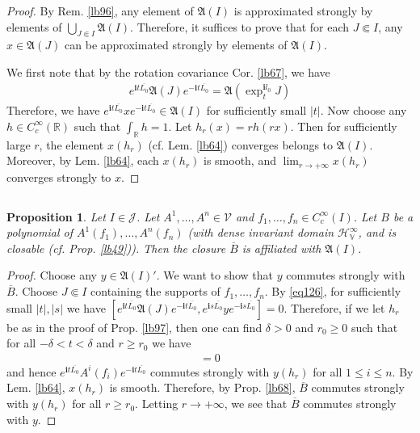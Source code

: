 \documentclass[12pt,b5paper,notitlepage]{article}
\theoremstyle{definition}
\theoremstyle{plain}
\newtheorem{pp}[df]{Proposition}
\newcommand{\fk}{\mathfrak}
\newcommand{\mc}{\mathcal}
\newcommand{\ovl}{\overline}
\newcommand{\im}{\mathbf{i}}
\newcommand{\Rbb}{\mathbb R}
\newcommand{\HV}{\mathcal H_{\mathbb V}}
\numberwithin{equation}{section}
\begin{document}
\begin{proof}
By Rem. \ref{lb96}, any element of $\fk A(I)$ is approximated strongly by elements of $\bigcup_{J\Subset I}\fk A(I)$. Therefore, it suffices to prove that for each $J\Subset I$, any $x\in\fk A(J)$ can be approximated strongly by elements of $\fk A(I)$. 


We first note that by the rotation covariance Cor. \ref{lb67}, we have
\begin{align}\label{eq126}
e^{\im t\ovl{L_0}}\fk A(J)e^{-\im t\ovl{L_0}}=\fk A(\exp^{\im l_0}_tJ)
\end{align}
Therefore, we have $e^{\im t\ovl{L_0}}xe^{-\im t\ovl{L_0}}\in\fk A(I)$ for sufficiently small $|t|$. Now choose any $h\in C_c^\infty(\Rbb)$ such that $\int_\Rbb h=1$. Let $h_r(x)=rh(rx)$. Then for sufficiently large $r$, the element $x(h_r)$ (cf. Lem. \ref{lb64}) converges belongs to $\fk A(I)$. Moreover, by Lem. \ref{lb64}, each $x(h_r)$ is smooth, and $\lim_{r\rightarrow+\infty} x(h_r)$ converges strongly to $x$.
\end{proof}




\subsection{}




\begin{pp}\label{lb98}
Let $I\in\mc J$. Let $A^1,\dots,A^n\in\mc V$ and $f_1,\dots,f_n\in C_c^\infty(I)$. Let $B$ be a polynomial of $A^1(f_1),\dots,A^n(f_n)$ (with dense invariant domain $\HV^\infty$, and is closable (cf. Prop. \ref{lb49})). Then the closure $\ovl B$ is affiliated with $\fk A(I)$.
\end{pp}


\begin{proof}
Choose any $y\in \fk A(I)'$. We want to show that $y$ commutes strongly with $\ovl B$. Choose $J\Subset I$ containing the supports of $f_1,\dots,f_n$. By \eqref{eq126}, for sufficiently small $|t|,|s|$ we have $[e^{\im t\ovl{L_0}}\fk A(J)e^{-\im t\ovl{L_0}},e^{\im s\ovl{L_0}}ye^{-\im s\ovl{L_0}}]=0$. Therefore, if we let $h_r$ be as in the proof of Prop. \ref{lb97}, then one can find $\delta>0$ and $r_0\geq0$ such that for all $-\delta<t<\delta$ and $r\geq r_0$ we have
\begin{align*}
[e^{\im t\ovl{L_0}}\fk A(J)e^{-\im t\ovl{L_0}},y(h_r)]=0
\end{align*}
and hence $e^{\im t\ovl{L_0}}A^i(f_i)e^{-\im t\ovl{L_0}}$ commutes strongly with $y(h_r)$ for all $1\leq i\leq n$. By Lem. \ref{lb64}, $x(h_r)$ is smooth. Therefore, by Prop. \ref{lb68}, $\ovl B$ commutes strongly with $y(h_r)$ for all $r\geq r_0$. Letting $r\rightarrow+\infty$, we see that $\ovl B$ commutes strongly with $y$.
\end{proof}
\end{document}
